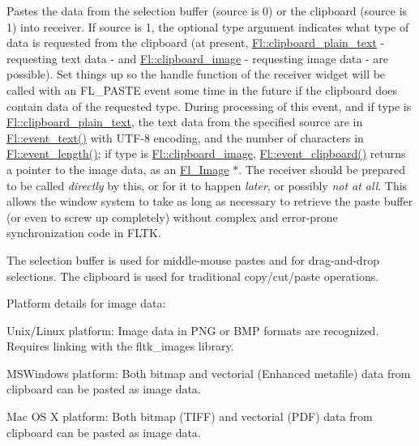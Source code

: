 Pastes the data from the selection buffer ({\ttfamily source} is 0) or the clipboard ({\ttfamily source} is 1) into {\ttfamily receiver}. If {\ttfamily source} is 1, the optional {\ttfamily type} argument indicates what type of data is requested from the clipboard (at present, \hyperlink{group__fl__clipboard_gae43ed653c1d222930510ad8042b55536}{Fl\+::clipboard\+\_\+plain\+\_\+text} -\/ requesting text data -\/ and \hyperlink{group__fl__clipboard_gae37fa003534c8cc9a84b66a7040ddfcb}{Fl\+::clipboard\+\_\+image} -\/ requesting image data -\/ are possible). Set things up so the handle function of the {\ttfamily receiver} widget will be called with an F\+L\+\_\+\+P\+A\+S\+TE event some time in the future if the clipboard does contain data of the requested type. During processing of this event, and if {\ttfamily type} is \hyperlink{group__fl__clipboard_gae43ed653c1d222930510ad8042b55536}{Fl\+::clipboard\+\_\+plain\+\_\+text}, the text data from the specified {\ttfamily source} are in \hyperlink{group__fl__events_ga6647c55948fe1d8be9367267529e9c54}{Fl\+::event\+\_\+text()} with U\+T\+F-\/8 encoding, and the number of characters in \hyperlink{group__fl__events_ga38f2de89fbdf59ad2cd4dca93f472911}{Fl\+::event\+\_\+length()}; if {\ttfamily type} is \hyperlink{group__fl__clipboard_gae37fa003534c8cc9a84b66a7040ddfcb}{Fl\+::clipboard\+\_\+image}, \hyperlink{group__fl__events_ga5964867d1d60792c45bb28082c257624}{Fl\+::event\+\_\+clipboard()} returns a pointer to the image data, as an \hyperlink{class_fl___image}{Fl\+\_\+\+Image} $\ast$. The receiver should be prepared to be called {\itshape directly} by this, or for it to happen {\itshape later}, or possibly {\itshape not at all}. This allows the window system to take as long as necessary to retrieve the paste buffer (or even to screw up completely) without complex and error-\/prone synchronization code in F\+L\+TK.

The selection buffer is used for middle-\/mouse pastes and for drag-\/and-\/drop selections. The clipboard is used for traditional copy/cut/paste operations.

\begin{DoxyParagraph}{Platform details for image data\+:}
\begin{DoxyItemize}
\item Unix/\+Linux platform\+: Image data in P\+NG or B\+MP formats are recognized. Requires linking with the fltk\+\_\+images library. \item M\+S\+Windows platform\+: Both bitmap and vectorial (Enhanced metafile) data from clipboard can be pasted as image data. \item Mac OS X platform\+: Both bitmap (T\+I\+FF) and vectorial (P\+DF) data from clipboard can be pasted as image data. \end{DoxyItemize}

\end{DoxyParagraph}
\mbox{\label{group__fl__clipboard_ga2514c08b3b2e43f849090cb636f34ce4}} 
